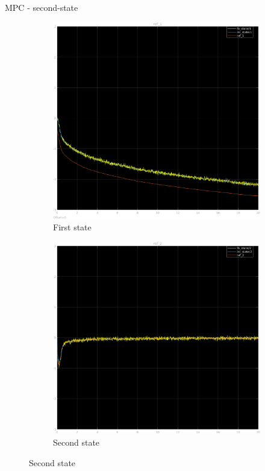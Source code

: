 \documentclass{beamer}
\begin{document}
\begin{frame}{MPC - second-state}
    \begin{figure}
        \centering
        \begin{subfigure}[b]{0.45\textwidth}
            \centering
            \includegraphics[width=\textwidth]{second_mpc_1.png}
            \caption{First state}
        \end{subfigure}
        \hfill
        \begin{subfigure}[b]{0.45\textwidth}
            \centering
            \includegraphics[width=\textwidth]{second_mpc_2.png}
            \caption{Second state}
        \end{subfigure}
    \end{figure}
\end{frame}
\end{document}
